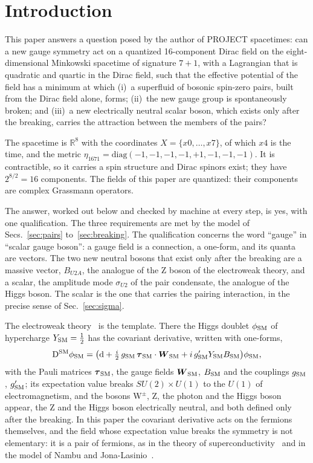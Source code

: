\section{Introduction}
\label{sec:intro}

This paper answers a question posed by the author of PROJECT spacetimes: can a new gauge
symmetry act on a quantized 16-component Dirac field on the eight-dimensional Minkowski
spacetime of signature $7+1$, with a Lagrangian that is quadratic and quartic in the Dirac
field, such that the effective potential of the field has a minimum at which (i)~a superfluid
of bosonic spin-zero pairs, built from the Dirac field alone, forms; (ii)~the new gauge group
is spontaneously broken; and (iii)~a new electrically neutral scalar boson, which exists only
after the breaking, carries the attraction between the members of the pairs?

The spacetime is $\mathbb R^8$ with the coordinates $X=\{x0,\dots,x7\}$, of which $x4$ is the
time, and the metric $\eta_{1671}=\mathrm{diag}(-1,-1,-1,-1,+1,-1,-1,-1)$. It is contractible,
so it carries a spin structure and Dirac spinors exist; they have $2^{8/2}=16$ components. The
fields of this paper are quantized: their components are complex Grassmann operators.

The answer, worked out below and checked by machine at every step, is yes, with one
qualification. The three requirements are met by the model of Secs.~\ref{sec:pairs}
to~\ref{sec:breaking}. The qualification concerns the word ``gauge'' in ``scalar gauge
boson'': a gauge field is a connection, a one-form, and its quanta are vectors. The two new
neutral bosons that exist only after the breaking are a massive vector, $B_{U2A}$, the analogue
of the Z boson of the electroweak theory, and a scalar, the amplitude mode $\sigma_{U2}$ of
the pair condensate, the analogue of the Higgs boson. The scalar is the one that carries
the pairing interaction, in the precise sense of Sec.~\ref{sec:sigma}.

The electroweak theory~\cite{Weinberg1967} is the template. There the Higgs doublet
$\phi_{\rm SM}$ of hypercharge $Y_{\rm SM}=\tfrac12$ has the covariant derivative, written with
one-forms,
\begin{equation}
\mathrm D^{\rm SM}\phi_{\rm SM}=\big(\mathrm d+\tfrac i2\,g_{\rm SM}\,\boldsymbol\tau_{\rm SM}\cdot\boldsymbol W_{\rm SM}
+i\,g'_{\rm SM}Y_{\rm SM}B_{\rm SM}\big)\phi_{\rm SM},
\label{eq:sm}
\end{equation}
with the Pauli matrices $\boldsymbol\tau_{\rm SM}$, the gauge fields $\boldsymbol W_{\rm SM}$,
$B_{\rm SM}$ and the couplings $g_{\rm SM}$, $g'_{\rm SM}$; its expectation value breaks
$SU(2)\times U(1)$ to the $U(1)$ of electromagnetism, and the bosons W$^\pm$, Z, the photon and
the Higgs boson appear, the Z and the Higgs boson electrically neutral, and both defined only
after the breaking. In this paper the covariant derivative acts on the fermions themselves,
and the field whose expectation value breaks the symmetry is not elementary: it is a pair of
fermions, as in the theory of superconductivity~\cite{BCS1957,Nambu1960} and in the model of
Nambu and Jona-Lasinio~\cite{NJL1961}.

